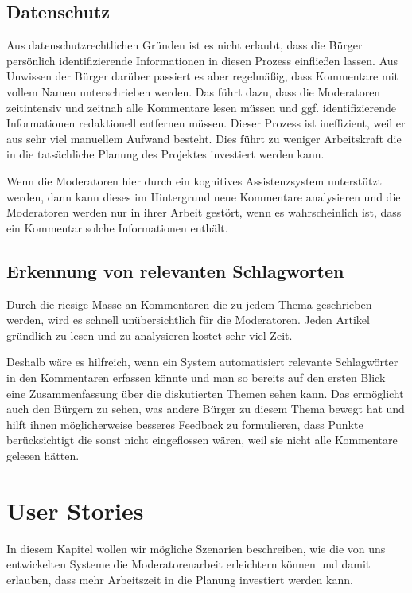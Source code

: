 \documentclass[runningheads]{llncs}
\begin{document}
	\subsection{Datenschutz}
		Aus datenschutzrechtlichen Gründen ist es nicht erlaubt, dass die Bürger persönlich identifizierende Informationen in diesen Prozess einfließen lassen.
		Aus Unwissen der Bürger darüber passiert es aber regelmäßig, dass Kommentare mit vollem Namen unterschrieben werden.
		Das führt dazu, dass die Moderatoren zeitintensiv und zeitnah alle Kommentare lesen müssen und ggf. identifizierende Informationen redaktionell entfernen müssen.
		Dieser Prozess ist ineffizient, weil er aus sehr viel manuellem Aufwand besteht.
		Dies führt zu weniger Arbeitskraft die in die tatsächliche Planung des Projektes investiert werden kann.
		
		Wenn die Moderatoren hier durch ein kognitives Assistenzsystem unterstützt werden, dann kann dieses im Hintergrund neue Kommentare analysieren und die Moderatoren werden nur in ihrer Arbeit gestört, wenn es wahrscheinlich ist, dass ein Kommentar solche Informationen enthält.
	
	\subsection{Erkennung von relevanten Schlagworten}
		Durch die riesige Masse an Kommentaren die zu jedem Thema geschrieben werden, wird es schnell unübersichtlich für die Moderatoren.
		Jeden Artikel gründlich zu lesen und zu analysieren kostet sehr viel Zeit.
		
		Deshalb wäre es hilfreich, wenn ein System automatisiert relevante Schlagwörter in den Kommentaren erfassen könnte und man so bereits auf den ersten Blick eine Zusammenfassung über die diskutierten Themen sehen kann.
		Das ermöglicht auch den Bürgern zu sehen, was andere Bürger zu diesem Thema bewegt hat und hilft ihnen möglicherweise besseres Feedback zu formulieren, dass Punkte berücksichtigt die sonst nicht eingeflossen wären, weil sie nicht alle Kommentare gelesen hätten.

\section{User Stories}
	In diesem Kapitel wollen wir mögliche Szenarien beschreiben, wie die von uns entwickelten Systeme die Moderatorenarbeit erleichtern können und damit erlauben, dass mehr Arbeitszeit in die Planung investiert werden kann.
	
\end{document}
